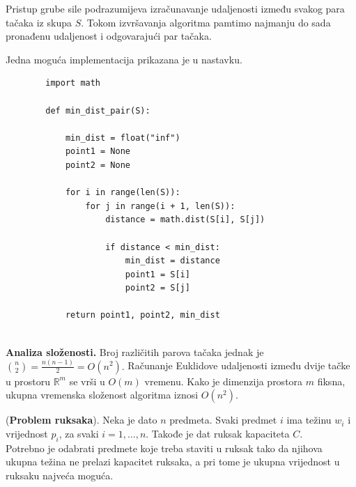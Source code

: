 \begin{solution}
	
	Pristup grube sile podrazumijeva izračunavanje udaljenosti između svakog para tačaka iz skupa $S$. Tokom izvršavanja algoritma pamtimo najmanju do sada pronađenu udaljenost i odgovarajući par tačaka.
	
	Jedna moguća implementacija prikazana je u nastavku.
	
	\begin{verbatim}
		import math
		
		def min_dist_pair(S):
		
		    min_dist = float("inf")
		    point1 = None
		    point2 = None
		
		    for i in range(len(S)):
		        for j in range(i + 1, len(S)):
		            distance = math.dist(S[i], S[j])
		
		            if distance < min_dist:
		                min_dist = distance
		                point1 = S[i]
		                point2 = S[j]
		
		    return point1, point2, min_dist
		
	\end{verbatim}
	
\end{solution}

\textbf{Analiza složenosti.} Broj različitih parova tačaka jednak je $\binom{n}{2}=\frac{n(n-1)}{2}=O(n^2).$  Računanje Euklidove udaljenosti između dvije tačke u prostoru $\mathbb{R}^m$ se vrši u $O(m)$ vremenu. Kako je dimenzija prostora $m$ fiksna, ukupna vremenska složenost algoritma iznosi $O(n^2).$

\vspace{0.3cm}

\begin{example}
	(\textbf{Problem ruksaka}). 
	Neka je dato $n$ predmeta. Svaki predmet $i$ ima težinu $w_i$ i vrijednost $p_i$, za svaki $i=1,\ldots,n$. Takođe je dat ruksak kapaciteta $C$.\\
	Potrebno je odabrati predmete koje treba staviti u ruksak tako da njihova ukupna težina ne prelazi kapacitet ruksaka, a pri tome je ukupna vrijednost u ruksaku najveća moguća.

\end{example}

